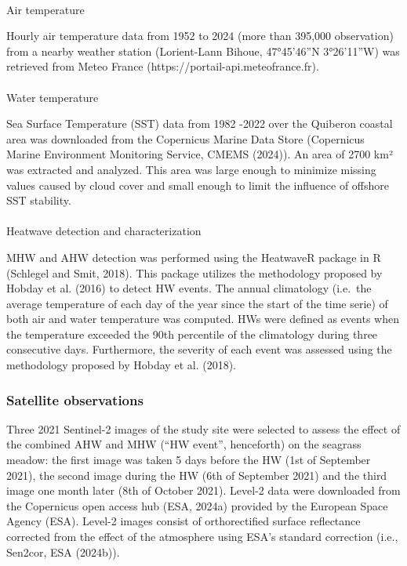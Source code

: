 \documentclass[
  letterpaper,
  11pt,
  english,
  singlespacing,
  headsepline]{MastersDoctoralThesis}
\makeatletter
\let\oldparagraph\paragraph
\renewcommand{\paragraph}{
    \@ifstar
      \xxxParagraphStar
      \xxxParagraphNoStar
  }
\newcommand{\xxxParagraphStar}[1]{\oldparagraph*{#1}\mbox{}}
\newcommand{\xxxParagraphNoStar}[1]{\oldparagraph{#1}\mbox{}}
\makeatother
\begin{document}
\begin{spacing}{1.5}
\paragraph{Air temperature}\label{air-temperature}

Hourly air temperature data from 1952 to 2024 (more than 395,000
observation) from a nearby weather station (Lorient-Lann Bihoue,
47°45'46''N 3°26'11''W) was retrieved from Meteo France
(https://portail-api.meteofrance.fr).

\paragraph{Water temperature}\label{water-temperature}

Sea Surface Temperature (SST) data from 1982 -2022 over the Quiberon
coastal area was downloaded from the Copernicus Marine Data Store
(Copernicus Marine Environment Monitoring Service, CMEMS (2024)). An
area of 2700 km² was extracted and analyzed. This area was large enough
to minimize missing values caused by cloud cover and small enough to
limit the influence of offshore SST stability.

\paragraph{Heatwave detection and
characterization}\label{heatwave-detection-and-characterization}

MHW and AHW detection was performed using the HeatwaveR package in R
(Schlegel and Smit, 2018). This package utilizes the methodology
proposed by Hobday et al. (2016) to detect HW events. The annual
climatology (i.e.~the average temperature of each day of the year since
the start of the time serie) of both air and water temperature was
computed. HWs were defined as events when the temperature exceeded the
90th percentile of the climatology during three consecutive days.
Furthermore, the severity of each event was assessed using the
methodology proposed by Hobday et al. (2018).

\subsubsection{Satellite observations}\label{satellite-observations}

Three 2021 Sentinel-2 images of the study site were selected to assess
the effect of the combined AHW and MHW (``HW event'', henceforth) on the
seagrass meadow: the first image was taken 5 days before the HW (1st of
September 2021), the second image during the HW (6th of September 2021)
and the third image one month later (8th of October 2021). Level-2 data
were downloaded from the Copernicus open access hub (ESA, 2024a)
provided by the European Space Agency (ESA). Level-2 images consist of
orthorectified surface reflectance corrected from the effect of the
atmosphere using ESA's standard correction (i.e., Sen2cor, ESA (2024b)).


\end{spacing}
\end{document}

